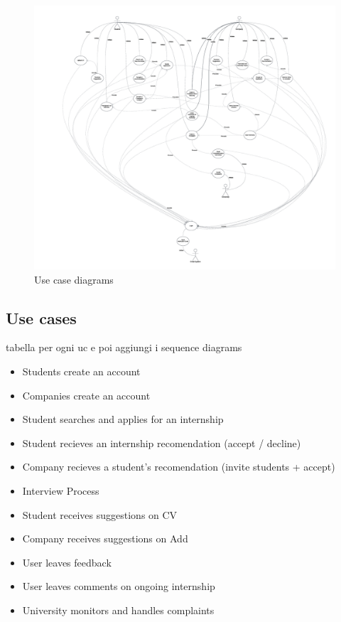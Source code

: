 \begin{figure}[H]
    \centering
    \includegraphics[width=1\linewidth]{RASD//Images/usecase.png}
    \caption{Use case diagrams}
    \label{fig:enter-label}
\end{figure}


\subsection{Use cases}
tabella per ogni uc e poi aggiungi i sequence diagrams
\begin{itemize}
\item Students create an account
\item Companies create an account
\item Student searches and applies for an internship
\item Student recieves an internship recomendation (accept / decline)
\item Company recieves a student’s recomendation (invite students + accept)
\item Interview Process
\item Student receives suggestions on CV
\item Company receives suggestions on Add
\item User leaves feedback
\item User leaves comments on ongoing internship
\item University monitors and handles complaints
\end{itemize}

